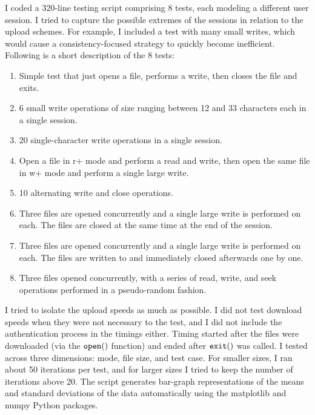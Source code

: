 \documentclass[pageno]{jpaper}
\begin{document}
I coded a 320-line testing script comprising 8 tests, each modeling a different user session. I tried to capture the possible extremes of the sessions in relation to the upload schemes. For example, I included a test with many small writes, which would cause a consistency-focused strategy to quickly become inefficient. Following is a short description of the 8 tests:
\begin{enumerate}[start=0]
\item Simple test that just opens a file, performs a write, then closes the file and exits.
\item 6 small write operations of size ranging between 12 and 33 characters each in a single session.
\item 20 single-character write operations in a single session.
\item Open a file in r+ mode and perform a read and write, then open the same file in w+ mode and perform a single large write.
\item 10 alternating write and close operations.
\item Three files are opened concurrently and a single large write is performed on each. The files are closed at the same time at the end of the session.
\item Three files are opened concurrently and a single large write is performed on each. The files are written to and immediately closed afterwards one by one.
\item Three files opened concurrently, with a series of read, write, and seek operations performed in a pseudo-random fashion.
\end{enumerate}
I tried to isolate the upload speeds as much as possible. I did not test download speeds when they were not necessary to the test, and I did not include the authentication process in the timings either. Timing started after the files were downloaded (via the $\tt{open()}$ function) and ended after $\tt{exit()}$ was called. I tested across three dimensions: mode, file size, and test case. For smaller sizes, I ran about 50 iterations per test, and for larger sizes I tried to keep the number of iterations above 20. The script generates bar-graph representations of the means and standard deviations of the data automatically using the matplotlib and numpy Python packages.
\end{document}
